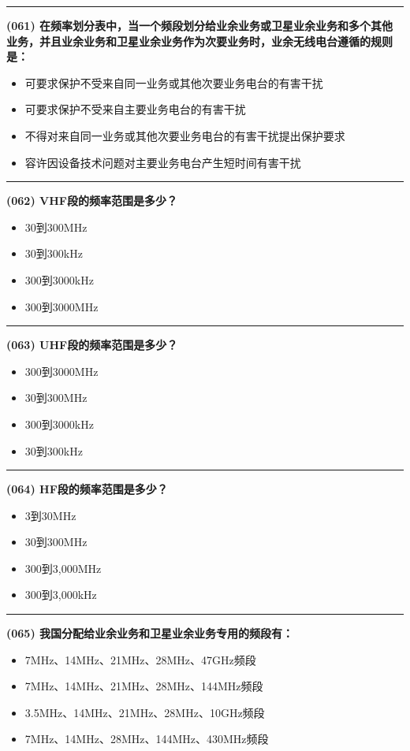 \documentclass[twocolumn]{ctexart}  %
\begin{document}
\noindent\rule{0.5\textwidth}{1pt}
\heiti \textbf{(061) 在频率划分表中，当一个频段划分给业余业务或卫星业余业务和多个其他业务，并且业余业务和卫星业余业务作为次要业务时，业余无线电台遵循的规则是：} \songti {\color{gray} [LK0143] }
\begin{itemize}
	\item  可要求保护不受来自同一业务或其他次要业务电台的有害干扰
	\item  可要求保护不受来自主要业务电台的有害干扰
	\item  不得对来自同一业务或其他次要业务电台的有害干扰提出保护要求
	\item  容许因设备技术问题对主要业务电台产生短时间有害干扰
\end{itemize}


\noindent\rule{0.5\textwidth}{1pt}
\heiti \textbf{(062) VHF段的频率范围是多少？} \songti {\color{gray} [LK1112] }
\begin{itemize}
	\item  30到300MHz
	\item  30到300kHz
	\item  300到3000kHz
	\item  300到3000MHz
\end{itemize}


\noindent\rule{0.5\textwidth}{1pt}
\heiti \textbf{(063) UHF段的频率范围是多少？} \songti {\color{gray} [LK1113] }
\begin{itemize}
	\item  300到3000MHz
	\item  30到300MHz
	\item  300到3000kHz
	\item  30到300kHz
\end{itemize}


\noindent\rule{0.5\textwidth}{1pt}
\heiti \textbf{(064) HF段的频率范围是多少？} \songti {\color{gray} [LK1114] }
\begin{itemize}
	\item  3到30MHz
	\item  30到300MHz
	\item  300到3,000MHz
	\item  300到3,000kHz
\end{itemize}


\noindent\rule{0.5\textwidth}{1pt}
\heiti \textbf{(065) 我国分配给业余业务和卫星业余业务专用的频段有：} \songti {\color{gray} [LK0144] }
\begin{itemize}
	\item  7MHz、14MHz、21MHz、28MHz、47GHz频段
	\item  7MHz、14MHz、21MHz、28MHz、144MHz频段
	\item  3.5MHz、14MHz、21MHz、28MHz、10GHz频段
	\item  7MHz、14MHz、28MHz、144MHz、430MHz频段
\end{itemize}
\end{document}
